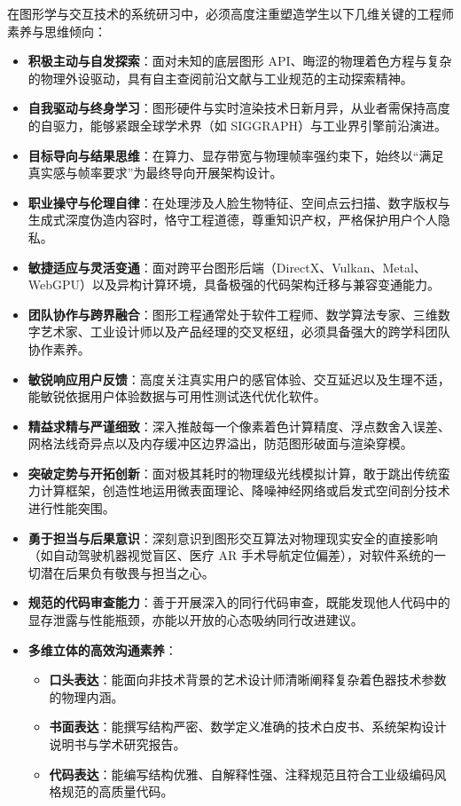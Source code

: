 在图形学与交互技术的系统研习中，必须高度注重塑造学生以下几维关键的工程师素养与思维倾向：
\begin{itemize}
    \item \textbf{积极主动与自发探索}：面对未知的底层图形 API、晦涩的物理着色方程与复杂的物理外设驱动，具有自主查阅前沿文献与工业规范的主动探索精神。
    \item \textbf{自我驱动与终身学习}：图形硬件与实时渲染技术日新月异，从业者需保持高度的自驱力，能够紧跟全球学术界（如 SIGGRAPH）与工业界引擎前沿演进。
    \item \textbf{目标导向与结果思维}：在算力、显存带宽与物理帧率强约束下，始终以“满足真实感与帧率要求”为最终导向开展架构设计。
    \item \textbf{职业操守与伦理自律}：在处理涉及人脸生物特征、空间点云扫描、数字版权与生成式深度伪造内容时，恪守工程道德，尊重知识产权，严格保护用户个人隐私。
    \item \textbf{敏捷适应与灵活变通}：面对跨平台图形后端（DirectX、Vulkan、Metal、WebGPU）以及异构计算环境，具备极强的代码架构迁移与兼容变通能力。
    \item \textbf{团队协作与跨界融合}：图形工程通常处于软件工程师、数学算法专家、三维数字艺术家、工业设计师以及产品经理的交叉枢纽，必须具备强大的跨学科团队协作素养。
    \item \textbf{敏锐响应用户反馈}：高度关注真实用户的感官体验、交互延迟以及生理不适，能敏锐依据用户体验数据与可用性测试迭代优化软件。
    \item \textbf{精益求精与严谨细致}：深入推敲每一个像素着色计算精度、浮点数舍入误差、网格法线奇异点以及内存缓冲区边界溢出，防范图形破面与渲染穿模。
    \item \textbf{突破定势与开拓创新}：面对极其耗时的物理级光线模拟计算，敢于跳出传统蛮力计算框架，创造性地运用微表面理论、降噪神经网络或启发式空间剖分技术进行性能突围。
    \item \textbf{勇于担当与后果意识}：深刻意识到图形交互算法对物理现实安全的直接影响（如自动驾驶机器视觉盲区、医疗 AR 手术导航定位偏差），对软件系统的一切潜在后果负有敬畏与担当之心。
    \item \textbf{规范的代码审查能力}：善于开展深入的同行代码审查，既能发现他人代码中的显存泄露与性能瓶颈，亦能以开放的心态吸纳同行改进建议。
    \item \textbf{多维立体的高效沟通素养}：
    \begin{itemize}
        \item \textbf{口头表达}：能面向非技术背景的艺术设计师清晰阐释复杂着色器技术参数的物理内涵。
        \item \textbf{书面表达}：能撰写结构严密、数学定义准确的技术白皮书、系统架构设计说明书与学术研究报告。
        \item \textbf{代码表达}：能编写结构优雅、自解释性强、注释规范且符合工业级编码风格规范的高质量代码。
    \end{itemize}
\end{itemize}

